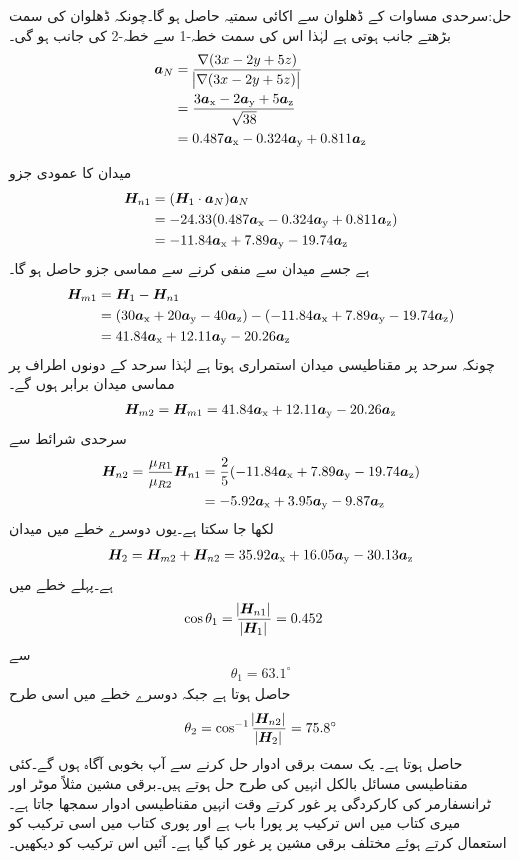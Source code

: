 حل:سرحدی مساوات کے  ڈھلوان سے اکائی سمتیہ حاصل ہو گا۔چونکہ ڈھلوان کی سمت بڑھتے جانب ہوتی ہے لہٰذا اس کی سمت خطہ-1 سے خطہ-2 کی جانب ہو گی۔
\begin{align*}
\aN&=\frac{\nabla (3x-2y+5z)}{\abs{\nabla (3x-2y+5z)}}\\
&=\frac{3\ax-2\ay+5\az}{\sqrt{38}}\\
&=0.487\ax-0.324\ay+0.811\az
\end{align*} 

میدان کا عمودی جزو
\begin{align*}
\kvec{H}_{n1}&=(\kvec{H}_1 \cdot \aN) \aN\\
&=-24.33(0.487\ax-0.324\ay+0.811\az)\\
&=-11.84\ax+7.89\ay-19.74\az
\end{align*}
ہے جسے میدان سے منفی کرنے سے مماسی جزو حاصل ہو گا۔
\begin{align*}
\kvec{H}_{m1}&=\kvec{H}_1-\kvec{H}_{n1}\\
&=(30\ax+20\ay-40\az)-(-11.84\ax+7.89\ay-19.74\az)\\
&=41.84\ax+12.11\ay-20.26\az
\end{align*}
چونکہ سرحد پر مقناطیسی میدان استمراری ہوتا ہے لہٰذا سرحد  کے دونوں اطراف پر مماسی میدان برابر ہوں گے۔
\begin{align*}
\kvec{H}_{m2}=\kvec{H}_{m1}=41.84\ax+12.11\ay-20.26\az
\end{align*}
سرحدی شرائط سے 
\begin{align*}
\kvec{H}_{n2}=\frac{\mu_{R1}}{\mu_{R2}} \kvec{H}_{n1}&=\frac{2}{5}(-11.84\ax+7.89\ay-19.74\az)\\
&=-5.92\ax+3.95\ay-9.87\az
\end{align*}
لکھا جا سکتا ہے۔یوں دوسرے خطے میں میدان
\begin{align*}
\kvec{H}_2=\kvec{H}_{m2}+\kvec{H}_{n2}=35.92\ax+16.05\ay-30.13\az
\end{align*}
ہے۔پہلے خطے میں
\begin{align*}
\cos \theta_1&=\frac{\abs{\kvec{H}_{n1}}}{\abs{\kvec{H}_1}}=0.452
\end{align*}
سے
\begin{align*}
\theta_1=63.1^{\circ}
\end{align*}
حاصل ہوتا ہے جبکہ دوسرے خطے میں اسی طرح
\begin{align*}
\theta_2=\cos^{-1} \frac{\abs{\kvec{H}_{n2}}}{\abs{\kvec{H}_2}}=75.8^{\circ}
\end{align*}
حاصل ہوتا ہے۔
یک سمت برقی ادوار حل کرنے سے آپ بخوبی آگاہ ہوں گے۔کئی مقناطیسی مسائل بالکل انہیں کی طرح حل ہوتے ہیں۔برقی مشین مثلاً موٹر اور ٹرانسفارمر کی کارکردگی پر غور کرتے وقت انہیں مقناطیسی ادوار سمجھا جاتا ہے۔میری کتاب   میں اس ترکیب پر پورا باب ہے اور پوری کتاب میں اسی ترکیب کو استعمال کرتے ہوئے مختلف برقی مشین پر غور کیا گیا ہے۔ آئیں اس ترکیب کو دیکھیں۔

